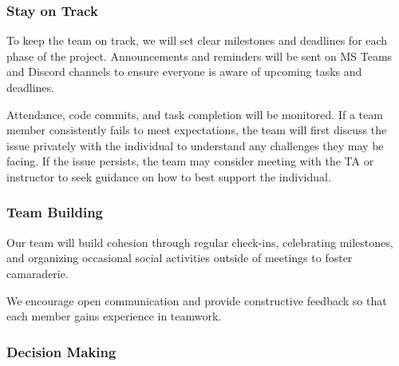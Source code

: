 \documentclass{article}
\begin{document}
\subsubsection*{Stay on Track}



To keep the team on track, we will set clear milestones and deadlines for each phase of the project.
Announcements and reminders will be sent on MS Teams and Discord channels
to ensure everyone is aware of upcoming tasks and deadlines.

Attendance, code commits, and task completion will be monitored. 
If a team member consistently fails to meet expectations, the team will first discuss the issue privately 
with the individual to understand any challenges they may be facing. If the issue persists, 
the team may consider meeting with the TA or instructor to seek guidance on how to best support the individual.

\subsubsection*{Team Building}

Our team will build cohesion through regular check-ins, 
celebrating milestones, and organizing occasional social 
activities outside of meetings to foster camaraderie.

We encourage open communication and provide constructive feedback so that 
each member gains experience in teamwork.

\subsubsection*{Decision Making} 
\end{document}
